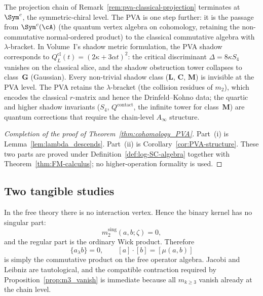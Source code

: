 \begin{remark}
\label{rem:pva-three-stage-vol1}%
%
%
The projection chain of
Remark~\ref{rem:pva-classical-projection} terminates at
$\Sym^c$, the symmetric-chiral level. The PVA is one step
further: it is the passage from $\Sym^c(\cA)$ (the
quantum vertex algebra on cohomology, retaining the
non-commutative normal-ordered product) to the classical
commutative algebra with $\lambda$-bracket. In Volume~I's
shadow metric formulation, the PVA shadow corresponds to
$Q_L^{\mathrm{cl}}(t) = (2\kappa + 3\alpha t)^2$: the
critical discriminant $\Delta = 8\kappa S_4$ vanishes on the
classical slice, and the shadow obstruction tower collapses to
class~$\mathbf{G}$ (Gaussian). Every non-trivial shadow class
($\mathbf{L}$, $\mathbf{C}$, $\mathbf{M}$) is invisible at
the PVA level. The PVA retains the $\lambda$-bracket (the
collision residues of $m_2$), which encodes the classical
$r$-matrix and hence the Drinfeld--Kohno data; the quartic and
higher shadow invariants ($S_4$, $Q^{\mathrm{contact}}$, the
infinite tower for class~$\mathbf{M}$) are quantum
corrections that require the chain-level $A_\infty$ structure.
\end{remark}

\begin{proof}[Completion of the proof of Theorem~\ref{thm:cohomology_PVA}]
Part~\textup{(i)} is Lemma~\ref{lem:lambda_descends}. Part~\textup{(ii)} is
Corollary~\ref{cor:PVA-structure}. These two parts are proved under
Definition~\ref{def:log-SC-algebra} together with
Theorem~\ref{thm:FM-calculus}; no higher-operation formality is used.
\end{proof}

\subsection{Two tangible studies}

\begin{example}
\label{ex:repaired-free-pva}
In the free theory there is no interaction vertex. Hence the binary kernel has no singular
part:
\[
m_2^{\mathrm{sing}}(a,b;\zeta)=0,
\]
and the regular part is the ordinary Wick product. Therefore
\[
\{a_\lambda b\}=0,
\qquad
[a]\cdot[b]=[\mu(a,b)]
\]
is simply the commutative product on the free operator algebra. Jacobi and Leibniz are
tautological, and the compatible contraction required by
Proposition~\ref{prop:m3_vanish} is immediate because all $m_{k\ge3}$ vanish already at
the chain level.
\end{example}

